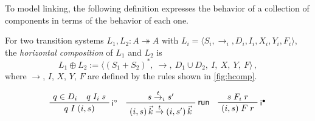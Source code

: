 \documentclass[sigplan,screen]{acmart}
\newcommand{\figsize}{\small}
\begin{document}
To model linking,
the following definition
expresses the behavior
of a collection of components
in terms of the behavior of each one.

\begin{definition} \label{def:hcomp} %
For two transition systems $L_1, L_2 : A \twoheadrightarrow A$
with
$L_i = \langle S_i, {\rightarrow}_i, D_i, I_i, X_i, Y_i, F_i \rangle$,
the \emph{horizontal composition} of $L_1$ and $L_2$
is
\[
    L_1 \oplus L_2 :=
    \big\langle
      (S_1 + S_2)^*, \: {\rightarrow}, \:
      D_1 \cup D_2, \:
      I, \: X, \: Y, \: F
    \big\rangle
  \,,
\]
where %
$\rightarrow$, $I$, $X$, $Y$, $F$
are defined by
the rules shown in \autoref{fig:hcomp}.
\end{definition}

\begin{figure} %
  \figsize
    \begin{gather*}
        \AxiomC{$q \in D_i$}
        \AxiomC{\hspace{-1.5em} $q \mathrel{I_i} s$}
        \RightLabel{$\kw{i}^\que$}
        \BinaryInfC{$q \mathrel{I} (i, s)$}
        \DisplayProof
        \quad
        \AxiomC{$s \stackrel{t}{\rightarrow}_i s'$}
        \RightLabel{$\kw{run}$}
        \UnaryInfC{$
            (i, s) \, \vec{k}
            \stackrel{t}{\rightarrow}
            (i, s') \, \vec{k}$}
        \DisplayProof
        \quad
        \AxiomC{$s \mathrel{F_i} r$}
        \RightLabel{$\kw{i}^\ans$}
        \UnaryInfC{$(i, s) \mathrel{F} r$}
        \DisplayProof
        \\[0.8em]
        \AxiomC{$s \mathrel{X_i} q$}

\end{gather*}
\end{figure}
\end{document}
